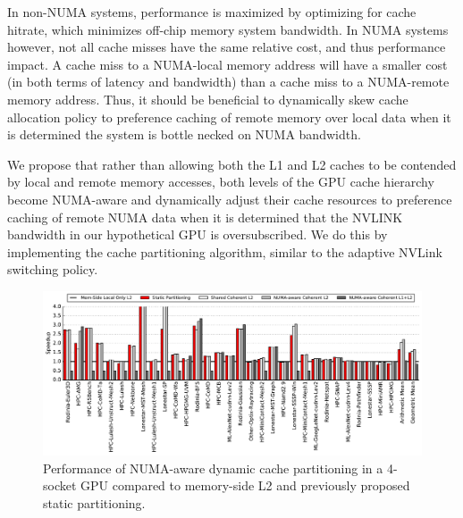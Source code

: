 In non-NUMA systems, performance is maximized by optimizing for cache hitrate, which
minimizes off-chip memory system bandwidth.  In NUMA systems however, not all cache
misses have the same relative cost, and thus performance impact.  A cache miss to a 
NUMA-local memory address will have a smaller cost (in both terms of latency and bandwidth)
than a cache miss to a NUMA-remote memory address.  Thus, it should be beneficial
to dynamically skew cache allocation policy to preference caching of remote memory over local
data when it is determined the system is bottle necked on NUMA bandwidth.

We propose that rather than allowing both the L1 and L2 caches to be contended by local
and remote memory accesses,  both levels of the GPU cache hierarchy become NUMA-aware
and dynamically adjust their cache resources to preference caching of remote NUMA
data when it is determined that the NVLINK bandwidth in our hypothetical GPU is
oversubscribed.  We do this by implementing the cache partitioning
algorithm, similar to the adaptive NVLink switching policy.

\begin{figure}[t]
    \centering
    \includegraphics[width=1.0\textwidth]{figures/plot_merged_cache_WB.pdf}
    \caption{Performance of NUMA-aware dynamic cache partitioning in a 4-socket GPU compared to memory-side L2 and previously proposed static partitioning.}
    \label{fig:dynamiccaching}
\end{figure}


